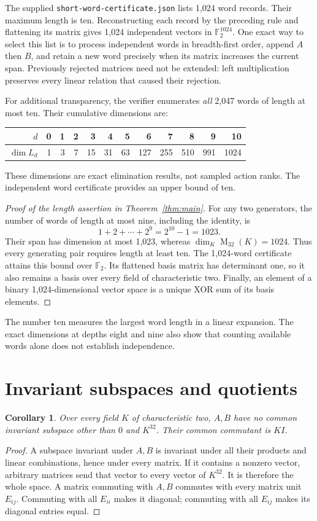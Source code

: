 \documentclass[11pt,a4paper]{article}
\newtheorem{corollary}[theorem]{Corollary}
\theoremstyle{definition}\newtheorem{definition}[theorem]{Definition}
\newcommand{\F}{\mathbb F_2}
\newcommand{\Mat}{\operatorname{M}}
\begin{document}
The supplied \texttt{short-word-certificate.json} lists 1,024 word records.
Their maximum length is ten. Reconstructing each record by the preceding
rule and flattening its matrix gives 1,024 independent vectors in
$\F^{1024}$. One exact way to select this list is to process independent
words in breadth-first order, append $A$ then $B$, and retain a new word
precisely when its matrix increases the current span. Previously rejected
matrices need not be extended: left multiplication preserves every linear
relation that caused their rejection.

For additional transparency, the verifier enumerates \emph{all} 2,047
words of length at most ten. Their cumulative dimensions are:
\begin{center}
\small
\begin{tabular}{@{}rrrrrrrrrrrr@{}}
\toprule
$d$&0&1&2&3&4&5&6&7&8&9&10\\
\midrule
$\dim L_d$&1&3&7&15&31&63&127&255&510&991&1024\\
\bottomrule
\end{tabular}
\end{center}
These dimensions are exact elimination results, not sampled action ranks.
The independent word certificate provides an upper bound of ten.

\begin{proof}[Proof of the length assertion in Theorem~\ref{thm:main}]
For any two generators, the number of words of length at most nine,
including the identity, is
\[
 1+2+\cdots+2^9=2^{10}-1=1023.
\]
Their span has dimension at most 1,023, whereas
$\dim_K\Mat_{32}(K)=1024$. Thus every generating pair requires length
at least ten. The 1,024-word certificate attains this bound over $\F$.
Its flattened basis matrix has determinant one, so it also remains a basis
over every field of characteristic two. Finally, an element of a binary
1,024-dimensional vector space is a unique XOR sum of its basis elements.
\end{proof}

The number ten measures the largest word length in a linear expansion.
The exact dimensions at depths eight
and nine also show that counting available words alone does not establish
independence.

\section{Invariant subspaces and quotients}
\begin{corollary}\label{cor:invariant}
Over every field $K$ of characteristic two, $A,B$ have no common invariant
subspace other than $0$ and $K^{32}$. Their common commutant is $K I$.
\end{corollary}
\begin{proof}
A subspace invariant under $A,B$ is invariant under all their products
and linear combinations, hence under every matrix. If it contains a
nonzero vector, arbitrary matrices send that vector to every vector of
$K^{32}$. It is therefore the whole space.
A matrix commuting with $A,B$ commutes with every matrix unit $E_{ij}$.
Commuting with all $E_{ii}$ makes it diagonal; commuting with all $E_{ij}$
makes its diagonal entries equal.
\end{proof}
\end{document}

